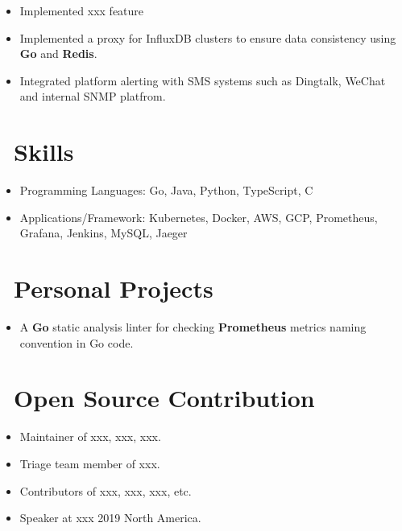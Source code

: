 \documentclass{resume}
\begin{document}
\begin{itemize}
  \item Implemented xxx feature
  \item Implemented a proxy for InfluxDB clusters to ensure data consistency using \textbf{Go} and \textbf{Redis}.
  \item Integrated platform alerting with SMS systems such as Dingtalk, WeChat and internal SNMP platfrom.
\end{itemize}

\section{\faCogs\ Skills}
\begin{itemize}[parsep=0.5ex]
  \item Programming Languages: Go, Java, Python, TypeScript, C
  \item Applications/Framework: Kubernetes, Docker, AWS, GCP, Prometheus, Grafana, Jenkins, MySQL, Jaeger
\end{itemize}

\section{\faInfo\ Personal Projects}
\begin{itemize}
  \item A \textbf{Go} static analysis linter for checking \textbf{Prometheus} metrics naming convention in Go code.
\end{itemize}

\section{\faInfo\ Open Source Contribution}
\begin{itemize}[parsep=0.5ex]
  \item Maintainer of xxx, xxx, xxx.
  \item Triage team member of xxx.
  \item Contributors of xxx, xxx, xxx, etc.
  \item Speaker at xxx 2019 North America.
\end{itemize}
\end{document}
